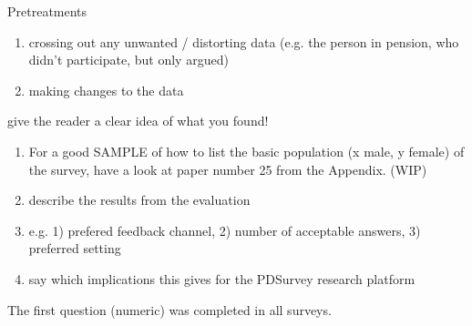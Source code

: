 
	Pretreatments
	\begin{enumerate}
	\item crossing out any unwanted / distorting data (e.g. the person in pension, who didn't participate, but only argued)
	\item making changes to the data
	\end{enumerate}




	give the reader a clear idea of what you found!


	\begin{enumerate}
	\item For a good SAMPLE of how to list the basic population (x male, y female) of the survey, have a look at paper number 25 from the Appendix. (WIP)
	\item describe the results from the evaluation
	\item e.g. 1) prefered feedback channel, 2) number of acceptable answers, 3) preferred setting
	\item say which implications this gives for the PDSurvey research platform
	\end{enumerate}
	


	The first question (numeric) was completed in all surveys. 








